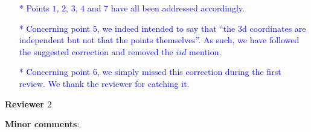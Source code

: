 \documentclass[10pt,a4paper]{article}
\begin{document}
\textcolor{blue}{
\begin{itemize}
\item[*]Points $1$, $2$, $3$, $4$ and $7$ have all been addressed accordingly.
\item[*]Concerning point $5$, we indeed intended to say that ``the 3d coordinates are independent but not that the points themselves''. As such, we have followed the suggested correction and removed the $iid$ mention.
\item[*]Concerning point $6$, we simply missed this correction during the first review. We thank the reviewer for catching it.
\end{itemize}}

\newpage
\textbf{\large{Reviewer $2$}}
\vspace*{0.5cm}

\textbf{Minor comments}:
\end{document}
